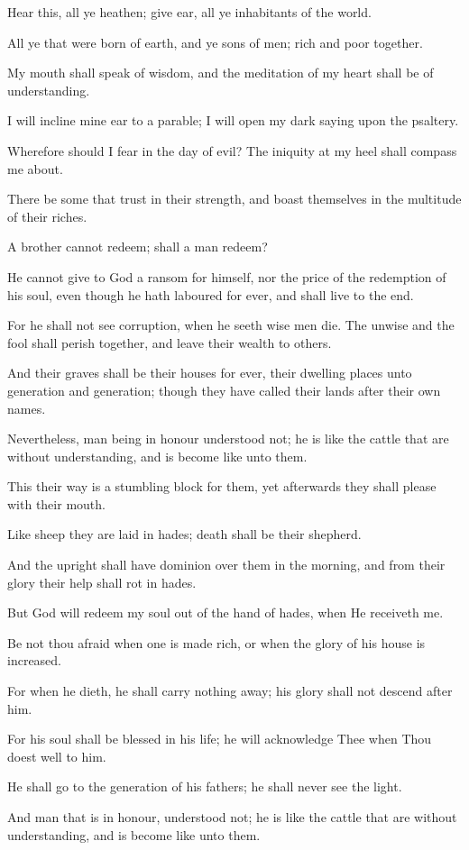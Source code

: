 Hear this, all ye heathen; give ear, all ye inhabitants of the world.

All ye that were born of earth, and ye sons of men; rich and poor together.

My mouth shall speak of wisdom, and the meditation of my heart shall be of understanding.

I will incline mine ear to a parable; I will open my dark saying upon the psaltery.

Wherefore should I fear in the day of evil? The iniquity at my heel shall compass me about.

There be some that trust in their strength, and boast themselves in the multitude of their riches.

A brother cannot redeem; shall a man redeem?

He cannot give to God a ransom for himself, nor the price of the redemption of his soul, even though he hath laboured for ever, and shall live to the end.

For he shall not see corruption, when he seeth wise men die. The unwise and the fool shall perish together, and leave their wealth to others.

And their graves shall be their houses for ever, their dwelling places unto generation and generation; though they have called their lands after their own names.

Nevertheless, man being in honour understood not; he is like the cattle that are without understanding, and is become like unto them.

This their way is a stumbling block for them, yet afterwards they shall please with their mouth.

Like sheep they are laid in hades; death shall be their shepherd.

And the upright shall have dominion over them in the morning, and from their glory their help shall rot in hades.

But God will redeem my soul out of the hand of hades, when He receiveth me.

Be not thou afraid when one is made rich, or when the glory of his house is increased.

For when he dieth, he shall carry nothing away; his glory shall not descend after him.

For his soul shall be blessed in his life; he will acknowledge Thee when Thou doest well to him.

He shall go to the generation of his fathers; he shall never see the light.

And man that is in honour, understood not; he is like the cattle that are without understanding, and is become like unto them.
